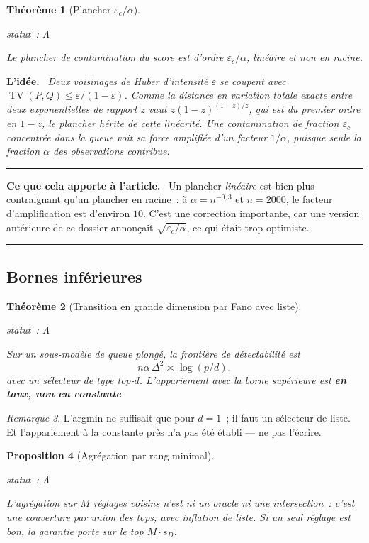 \documentclass[11pt]{article}
\theoremstyle{plain}
\newtheorem{theoreme}{Théorème}[section]
\newtheorem{proposition}[theoreme]{Proposition}
\theoremstyle{definition}
\theoremstyle{remark}
\newtheorem{remarque}[theoreme]{Remarque}
\DeclareMathOperator{\TV}{TV}
\newcommand{\1}{\mathbf 1}
\newcommand{\statut}[1]{%
  \nopagebreak\par\nopagebreak
  \hfill{\normalfont\footnotesize\textcolor{gris}{statut~: #1}}%
  \par\nopagebreak\vspace{-2pt}}
\newenvironment{idee}
  {\par\medskip\noindent\textcolor{bleu}{\textbf{L'idée.}}\ \itshape}
  {\par\medskip}
\newenvironment{apport}
  {\par\medskip\noindent\begingroup\color{bleu}\rule{\linewidth}{0.6pt}\par
   \nobreak\vspace{2pt}\noindent\textbf{Ce que cela apporte à l'article.}\ \normalcolor}
  {\par\vspace{2pt}\noindent\textcolor{bleu}{\rule{\linewidth}{0.6pt}}\endgroup\par\medskip}
\begin{document}
\begin{theoreme}[Plancher $\varepsilon_c/\alpha$]
\label{thm:contamination}
\statut{A}
Le plancher de contamination du score est d'ordre
$\varepsilon_c/\alpha$, \emph{linéaire} et non en racine.
\end{theoreme}

\begin{idee}
Deux voisinages de Huber d'intensité $\varepsilon$ se coupent avec
$\TV(P,Q)\le\varepsilon/(1-\varepsilon)$. Comme la distance en variation
totale exacte entre deux exponentielles de rapport $z$ vaut
$z(1-z)^{(1-z)/z}$, qui est du \emph{premier} ordre en $1-z$, le plancher
hérite de cette linéarité. Une contamination de fraction $\varepsilon_c$
concentrée dans la queue voit sa force amplifiée d'un facteur
$1/\alpha$, puisque seule la fraction $\alpha$ des observations
contribue.
\end{idee}

\begin{apport}
Un plancher \emph{linéaire} est bien plus contraignant qu'un plancher en
racine~: à $\alpha=n^{-0{,}3}$ et $n=2000$, le facteur d'amplification
est d'environ $10$. C'est une correction importante, car une version
antérieure de ce dossier annonçait $\sqrt{\varepsilon_c/\alpha}$, ce qui
était trop optimiste.
\end{apport}

\subsection{Bornes inférieures}

\begin{theoreme}[Transition en grande dimension par Fano avec liste]
\label{thm:fano}
\statut{A}
Sur un sous-modèle de queue plongé, la frontière de détectabilité est
\[
 n\alpha\,\Delta^2\asymp\log(p/d),
\]
avec un sélecteur de type top-$d$. L'appariement avec la borne supérieure
est \textbf{en taux, non en constante}.
\end{theoreme}

\begin{remarque}
L'argmin ne suffisait que pour $d=1$~; il faut un sélecteur de liste. Et
l'appariement à la constante près n'a pas été établi --- ne pas l'écrire.
\end{remarque}

\begin{proposition}[Agrégation par rang minimal]
\label{prop:agregation}
\statut{A}
L'agrégation sur $M$ réglages voisins n'est \emph{ni} un oracle \emph{ni}
une intersection~: c'est une couverture par \emph{union des tops}, avec
inflation de liste. Si un seul réglage est bon, la garantie porte sur le
top $M\cdot s_D$.
\end{proposition}
\end{document}
